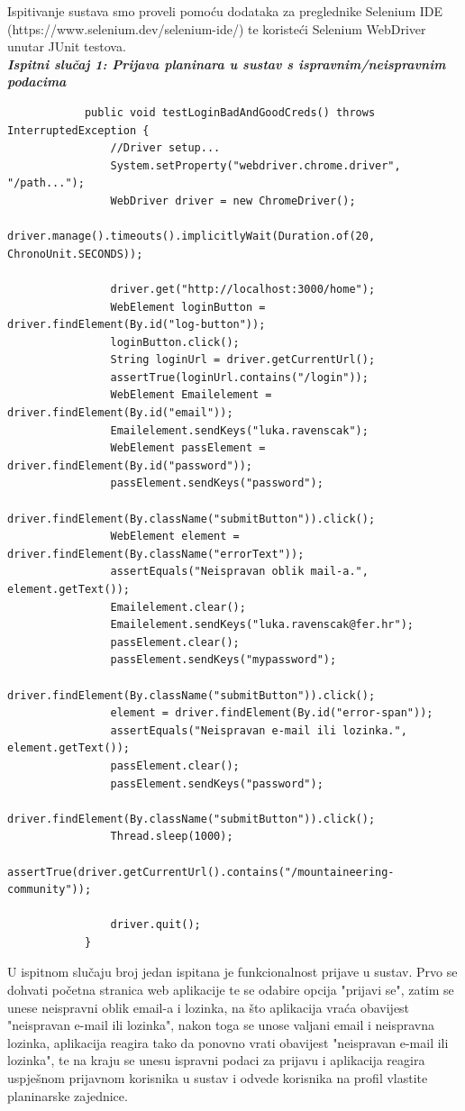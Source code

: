 			  Ispitivanje sustava smo proveli pomoću dodataka za preglednike Selenium IDE (https://www.selenium.dev/selenium-ide/) te koristeći Selenium WebDriver unutar JUnit testova.\\
	
		 	\textbf{\textit{Ispitni slučaj 1: Prijava planinara u sustav s ispravnim/neispravnim podacima}}
		 	
		 	\begin{lstlisting}
		 	public void testLoginBadAndGoodCreds() throws InterruptedException {
		 		//Driver setup...
		 		System.setProperty("webdriver.chrome.driver", "/path...");
		 		WebDriver driver = new ChromeDriver(); 
		 		driver.manage().timeouts().implicitlyWait(Duration.of(20, ChronoUnit.SECONDS));
		 		
		 		driver.get("http://localhost:3000/home");
		 		WebElement loginButton = driver.findElement(By.id("log-button"));
		 		loginButton.click();
		 		String loginUrl = driver.getCurrentUrl();
		 		assertTrue(loginUrl.contains("/login"));
		 		WebElement Emailelement = driver.findElement(By.id("email"));        
		 		Emailelement.sendKeys("luka.ravenscak");   
		 		WebElement passElement = driver.findElement(By.id("password"));
		 		passElement.sendKeys("password");
		 		driver.findElement(By.className("submitButton")).click();
		 		WebElement element = driver.findElement(By.className("errorText"));
		 		assertEquals("Neispravan oblik mail-a.", element.getText());
		 		Emailelement.clear();
		 		Emailelement.sendKeys("luka.ravenscak@fer.hr");
		 		passElement.clear();
		 		passElement.sendKeys("mypassword");
		 		driver.findElement(By.className("submitButton")).click();
		 		element = driver.findElement(By.id("error-span"));
		 		assertEquals("Neispravan e-mail ili lozinka.", element.getText());
		 		passElement.clear();
		 		passElement.sendKeys("password");
		 		driver.findElement(By.className("submitButton")).click();
		 		Thread.sleep(1000);
		 		assertTrue(driver.getCurrentUrl().contains("/mountaineering-community"));
		 		
		 		driver.quit();
		 	}
		 	\end{lstlisting}
	 	
	 	 U ispitnom slučaju broj jedan ispitana je funkcionalnost prijave u sustav. Prvo se dohvati početna stranica web aplikacije te se odabire opcija "prijavi se", zatim se unese neispravni oblik email-a i lozinka, na što aplikacija vraća obavijest "neispravan e-mail ili lozinka", nakon toga se unose valjani email i neispravna lozinka, aplikacija reagira tako da ponovno vrati obavijest "neispravan e-mail ili lozinka", te na kraju se unesu ispravni podaci za prijavu i aplikacija reagira uspješnom prijavnom korisnika u sustav i odvede korisnika na profil vlastite planinarske zajednice.\newline
	 	 
